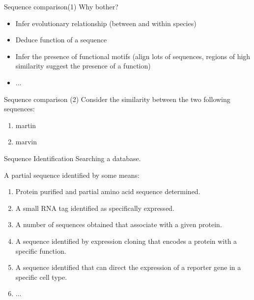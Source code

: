 \documentclass[pdf]{beamer}
\begin{document}


\begin{frame}{Sequence comparison(1)}
  Why bother?
  \begin{itemize}
    \item Infer evolutionary relationship (between and within species)
    \item Deduce function of a sequence
    \item Infer the presence of functional motifs (align lots of sequences,
      regions of high similarity suggest the presence of a function)
    \item ...
  \end{itemize}
  
\end{frame}

\begin{frame}{Sequence comparison (2)}
  Consider the similarity between the two following sequences:
  \begin{enumerate}
    \item martin
    \item marvin
  \end{enumerate}
  
\end{frame}

\begin{frame}{Sequence Identification}
  Searching a database.

  A partial sequence identified by some means:
  \begin{enumerate}
    \item Protein purified and partial amino acid sequence determined.
    \item A small RNA tag identified as specifically expressed.
    \item A number of sequences obtained that associate with a given protein.
    \item A sequence identified by expression cloning that encodes a protein with
      a specific function.
    \item A sequence identified that can direct the expression of a reporter gene
      in a specific cell type.
    \item ...
  \end{enumerate}
\end{frame}
\end{document}
